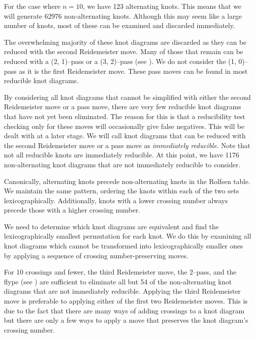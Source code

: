 \begin{paper}
For the case where $n=10$, we have 123 alternating knots.
This means that we will generate 62976 non-alternating knots.
Although this may seem like a large number of knots, most of these can be
examined and discarded immediately.

The overwhelming majority of these knot diagrams are discarded as they can be
reduced with the second Reidemeister move.
Many of those that remain can be reduced with a (2, 1)--pass or a (3, 2)--pass
(see \figMoves).
We do not consider the (1, 0)--pass as it is the first Reidemeister move.
These pass moves can be found in most reducible knot diagrams.


By considering all knot diagrams that cannot be simplified with either the
second Reidemeister move or a pass move, there are very few reducible knot
diagrams that have not yet been eliminated.
The reason for this is that a reducibility test checking only for these moves
will occasionally give false negatives.
This will be dealt with at a later stage.
We will call knot diagrams that can be reduced with the second Reidemeister move
or a pass move as \textit{immediately reducible}.
Note that not all reducible knots are immediately reducible.
At this point, we have 1176 non-alternating knot diagrams that are not
immediately reducible to consider.



Canonically, alternating knots precede non-alternating knots in the Rolfsen
table.
We maintain the same pattern, ordering the knots within each of the two sets
lexicographically.
Additionally, knots with a lower crossing number always precede those with a
higher crossing number.


We need to determine which knot diagrams are equivalent and find the
lexicographically smallest permutation for each knot.
We do this by examining all knot diagrams which cannot be transformed into
lexicographically smaller ones by applying a sequence of crossing
number-preserving moves.

For 10 crossings and fewer, the third Reidemeister move, the 2--pass, and the
flype (see \figMoves) are sufficient to eliminate all but 54 of the
non-alternating knot diagrams that are not immediately reducible.
Applying the third Reidemeister move is preferable to applying either of the
first two Reidemeister moves.
This is due to the fact that there are many ways of adding crossings to a knot
diagram but there are only a few ways to apply a move that preserves the knot
diagram's crossing number.


\end{paper}

